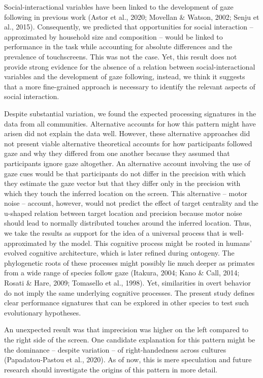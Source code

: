 \documentclass[
  man,floatsintext]{apa7}
\begin{document}
Social-interactional variables have been linked to the development of gaze following in previous work (Astor et al., 2020; Movellan \& Watson, 2002; Senju et al., 2015). Consequently, we predicted that opportunities for social interaction -- approximated by household size and composition -- would be linked to performance in the task while accounting for absolute differences and the prevalence of touchscreens. This was not the case. Yet, this result does not provide strong evidence for the absence of a relation between social-interactional variables and the development of gaze following, instead, we think it suggests that a more fine-grained approach is necessary to identify the relevant aspects of social interaction.

Despite substantial variation, we found the expected processing signatures in the data from all communities. Alternative accounts for how this pattern might have arisen did not explain the data well. However, these alternative approaches did not present viable alternative theoretical accounts for how participants followed gaze and why they differed from one another because they assumed that participants ignore gaze altogether. An alternative account involving the use of gaze cues would be that participants do not differ in the precision with which they estimate the gaze vector but that they differ only in the precision with which they touch the inferred location on the screen. This alternative -- motor noise -- account, however, would not predict the effect of target centrality and the u-shaped relation between target location and precision because motor noise should lead to normally distributed touches around the inferred location. Thus, we take the results as support for the idea of a universal process that is well-approximated by the model. This cognitive process might be rooted in humans' evolved cognitive architecture, which is later refined during ontogeny. The phylogenetic roots of these processes might possibly lie much deeper as primates from a wide range of species follow gaze (Itakura, 2004; Kano \& Call, 2014; Rosati \& Hare, 2009; Tomasello et al., 1998). Yet, similarities in overt behavior do not imply the same underlying cognitive processes. The present study defines clear performance signatures that can be explored in other species to test such evolutionary hypotheses.

An unexpected result was that imprecision was higher on the left compared to the right side of the screen. One candidate explanation for this pattern might be the dominance -- despite variation -- of right-handedness across cultures (Papadatou-Pastou et al., 2020). As of now, this is mere speculation and future research should investigate the origins of this pattern in more detail.
\end{document}

